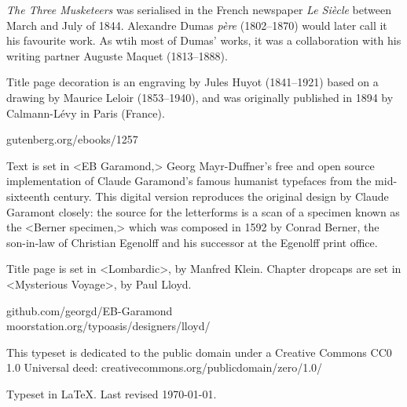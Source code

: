 \documentclass[
a5paper,
]{scrbook}
\begin{document}
\vfill
\begin{minipage}{\textwidth}
\textit{The Three Musketeers} was serialised in the French newspaper \textit{Le Siècle} between March and July of 1844. Alexandre Dumas \textit{père} (1802--1870) would later call it his favourite work. As wtih most of Dumas' works, it was a collaboration with his writing partner Auguste Maquet (1813--1888).

Title page decoration is an engraving by Jules Huyot (1841--1921) based on a drawing by Maurice Leloir (1853--1940), and was originally published in 1894 by Calmann-Lévy in Paris (France).

\end{minipage}
\vfill
gutenberg.org/ebooks/1257
\vfill
\divider
\vfill
\begin{minipage}{\textwidth}
Text is set in <EB Garamond,> Georg Mayr-Duffner's free and open source implementation of Claude Garamond’s famous humanist typefaces from the mid-sixteenth century. This digital version reproduces the original design by Claude Garamont closely: the source for the letterforms is a scan of a specimen known as the <Berner specimen,> which was composed in 1592 by Conrad Berner, the son-in-law of Christian Egenolff and his successor at the Egenolff print office.

Title page is set in <Lombardic>, by Manfred Klein. Chapter dropcaps are set in <Mysterious Voyage>, by Paul Lloyd.
\end{minipage}
\vfill
github.com/georgd/EB-Garamond\\moorstation.org/typoasis/designers/lloyd/
\vfill
\divider
\vfill
\begin{minipage}{\textwidth}
This typeset is dedicated to the public domain under a Creative Commons CC0 1.0 Universal deed: creativecommons.org/publicdomain/zero/1.0/\\
\end{minipage}
\vfill
\divider
\vfill
Typeset in \LaTeX{}. Last revised \today.
\thispagestyle{empty}
\end{document}
